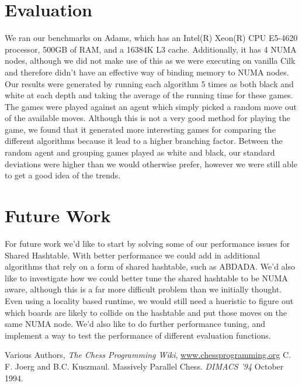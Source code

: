 \documentclass[]{article}
\begin{document}
\section{Evaluation}
We ran our benchmarks on Adams, which has an Intel(R) Xeon(R) CPU E5-4620 processor, 500GB of RAM, and a 16384K L3 cache.  Additionally, it has 4 NUMA nodes, although we did not make use of this as we were executing on vanilla Cilk and therefore didn't have an effective way of binding memory to NUMA nodes.  Our results were generated by running each algorithm 5 times as both black and white at each depth and taking the average of the running time for these games.  The games were played against an agent which simply picked a random move out of the available moves.  Although this is not a very good method for playing the game, we found that it generated more interesting games for comparing the different algorithms because it lead to a higher branching factor.  Between the random agent and grouping games played as white and black, our standard deviations were higher than we would otherwise prefer, however we were still able to get a good idea of the trends.

\section{Future Work}
For future work we'd like to start by solving some of our performance issues for Shared Hashtable.  With better performance we could add in additional algorithms that rely on a form of shared hashtable, such as ABDADA.  We'd also like to investigate how we could better tune the shared hashtable to be NUMA aware, although this is a far more difficult problem than we initially thought.  Even using a locality based runtime, we would still need a hueristic to figure out which boards are likely to collide on the hashtable and put those moves on the same NUMA node.  We'd also like to do further performance tuning, and implement a way to test the performance of different evaluation functions.
\begin{thebibliography}{9}
  Various Authors,
  \textit{The Chess Programming Wiki},
  \url{www.chessprogramming.org}
  C. F. Joerg and B.C. Kuszmaul.
  Massively Parallel Chess.
  \textit{DIMACS '94}
  October 1994.
\end{thebibliography}
\end{document}
